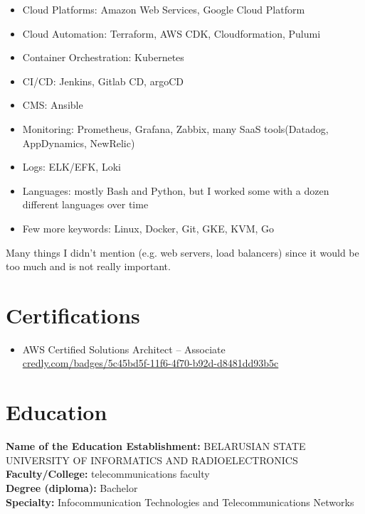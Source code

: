\documentclass[11pt]{letter}
\newcommand{\forceindent}{\leavevmode{\parindent=1em\indent} %
}
\begin{document}
\begin{itemize}
  \item Cloud Platforms: Amazon Web Services, Google Cloud Platform
  \item Cloud Automation: Terraform, AWS CDK, Cloudformation, Pulumi
  \item Container Orchestration: Kubernetes
  \item CI/CD: Jenkins, Gitlab CD, argoCD
  \item CMS: Ansible
  \item Monitoring: Prometheus, Grafana, Zabbix, many SaaS tools(Datadog, AppDynamics, NewRelic)
  \item Logs: ELK/EFK, Loki
  \item Languages: mostly Bash and Python, but I worked some with a dozen different languages over time
  \item Few more keywords: Linux, Docker, Git, GKE, KVM, Go
\end{itemize}

\forceindent Many things I didn't mention (e.g. web servers, load balancers) since it would be too much and is not really important.

\section*{Certifications\vphantom{certs}}

\begin{itemize}
    \item AWS Certified Solutions Architect – Associate \\
    \href{https://www.credly.com/badges/5c45bd5f-11f6-4f70-b92d-d8481dd93b5c}{credly.com/badges/5c45bd5f-11f6-4f70-b92d-d8481dd93b5c}
\end{itemize}

\section*{Education\vphantom{edu}}

\textbf{Name of the Education Establishment:} BELARUSIAN STATE UNIVERSITY OF INFORMATICS AND RADIOELECTRONICS \\
\textbf{Faculty/College:} telecommunications faculty \\
\textbf{Degree (diploma):} Bachelor \\
\textbf{Specialty:} Infocommunication Technologies and Telecommunications Networks \\
\end{document}
